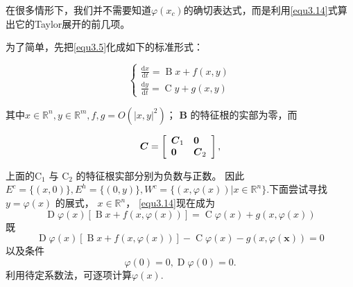 在很多情形下，我们并不需要知道\(\varphi(x_c)\)的确切表达式，而是利用\ref{equ3.14}式算出它的Taylor展开的前几项。

为了简单，先把\ref{equ3.5}化成如下的标准形式：

\begin{equation}
	\left\{
	\begin{array} { l }
		{ \frac { \mathrm { d } x } { \mathrm { d } t } = \operatorname { B } x + f ( x , y ) } \\
		{ \frac { \mathrm { d } y } { \mathrm { d } t } = \operatorname { C }y + g ( x , y ) }
	\end{array}
	\right.
	\label{eq:1.3.15}
\end{equation}

其中$x \in \mathbb { R } ^ { n } , y \in \mathbb { R } ^ { m } , f , g = O \left( | x , y | ^ { 2 } \right)$；
\(\mathbf{B}\) 的特征根的实部为零，而

\[
	\boldsymbol { C } =
	\left[
		\begin{array} { l l }
			{ \boldsymbol { C } _ { 1 } } & { \mathbf { 0 } }             \\
			{ \mathbf { 0 } }             & { \boldsymbol { C } _ { 2 } }
		\end{array}
		\right]
	,
\]

上面的\(\operatorname{C_1}\) 与 \(\operatorname{C_2}\) 的特征根实部分别为负数与正数。
因此 \(  E ^ { c} = \{ ( x,0)\} ,E ^ { h } = \{ ( 0 , y ) \} , W ^ { c } = \{ ( x , \varphi ( x ) ) | x \in \mathbb { R } ^ { n } \}\).下面尝试寻找\(y=\varphi(x)\) 的展式，
$x \in \mathbb { R } ^ { n }$，
\ref{equ3.14}现在成为
\[
	\operatorname { D} \varphi  ( x ) \left[ \operatorname { B }  { x } + f ( x , \varphi ( x ) ) \right] = \operatorname{C} \varphi ( x ) + g ( x , \varphi ( x ) )
\]
既
\begin{equation}
	\operatorname { D } \varphi ( x ) [ \operatorname { B } x + f ( x , \varphi ( x ) ) ] - \operatorname { C } \varphi ( x ) - g ( x , \varphi ( \boldsymbol { x } ) ) = 0
	\label{eq:1.3.16}
\end{equation}
以及条件
\[
	\varphi ( 0 ) = 0 , \operatorname { D } \varphi ( 0 ) = 0.
\]
利用待定系数法，可逐项计算\(\varphi(x)\).

